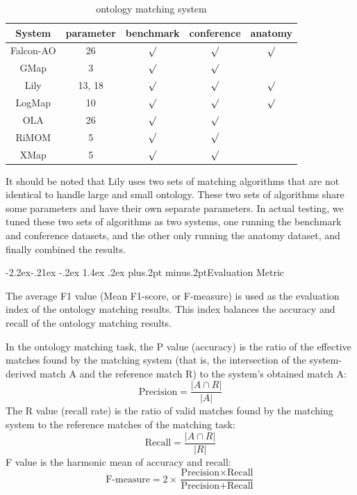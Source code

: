 \documentclass[twoside]{article}
\makeatletter
\def\subsubsection{\@startsection{subsubsection}{3}{\z@}%
 {-2.2ex\@plus -.21ex \@minus -.2ex}%
 {1.4ex \@plus.2ex}
{\normalfont\normalsize\protect\baselineskip=12pt plus.2pt minus.2pt\sl}}
\makeatother
\begin{document}
\begin{table}[ht]
\centering
\caption{ontology matching system}
\label{table:om_sys}
\begin{tabular}{@{}ccccc@{}}
\toprule
System		& parameter	& benchmark	& conference	& anatomy	                \\ \midrule
Falcon-AO	& 26		& $\surd$			& $\surd$				& $\surd$	\\
GMap		& 3			& $\surd$			& $\surd$				&  			\\
Lily		& 13, 18	& $\surd$			& $\surd$				& $\surd$	\\
LogMap		& 10		& $\surd$			& $\surd$				& $\surd$	\\
OLA			& 26		& $\surd$			& $\surd$				&  			\\
RiMOM		& 5			& $\surd$			& $\surd$				&  			\\
XMap		& 5			& $\surd$			& $\surd$				&  			\\ \bottomrule
\end{tabular}
\end{table}

It should be noted that Lily uses two sets of matching algorithms that are not identical to handle large and small ontology. These two sets of algorithms share some parameters and have their own separate parameters.
In actual testing, we tuned these two sets of algorithms as two systems, one running the benchmark and conference datasets, and the other only running the anatomy dataset, and finally combined the results.

\subsubsection{Evaluation Metric}

The average F1 value (Mean F1-score, or F-measure)\cite{wwy59} is used as the evaluation index of the ontology matching results. This index balances the accuracy and recall of the ontology matching results.

In the ontology matching task, the P value (accuracy) is the ratio of the effective matches found by the matching system (that is, the intersection of the system-derived match A and the reference match R) to the system's obtained match A:
\begin{equation}
\text{Precision} = \frac{{\left| {A \cap R} \right|}}{{\left| A \right|}}
\end{equation}
The R value (recall rate) is the ratio of valid matches found by the matching system to the reference matches of the matching task:
\begin{equation}
\text{Recall} = \frac{{\left| {A \cap R} \right|}}{{\left| {R} \right|}}
\end{equation}
F value is the harmonic mean of accuracy and recall:
\begin{equation}
\text{F-measure} = {2}\times\frac{\text{Precision} \times \text{Recall}}{\text{Precision} + \text{Recall}}
\end{equation}
\end{document}
